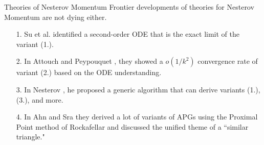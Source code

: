 \documentclass[11pt]{beamer}
\theoremstyle{definition}
\begin{document}
    \begin{frame}{Theories of Nesterov Momentum}
        Frontier developments of theories for Nesterov Momentum are not dying either. 
        \begin{itemize}
            \item [1.] Su et al. \cite{su_differential_2015} identified a second-order ODE that is the exact limit of the variant (1.). 
            \item [2.] In Attouch and Peypouquet \cite{attouch_rate_2016}, they showed a $o(1/k^2)$ convergence rate of variant (2.) based on the ODE understanding. 
            \item [3.] In Nesterov \cite{nesterov_lecture_2018}, he proposed a generic algorithm that can derive variants (1.), (3.), and more. 
            \item [4.] In Ahn and Sra \cite{ahn_understanding_2022}
            they derived a lot of variants of APGs using the Proximal Point method of Rockafellar and discussed the unified theme of a ``similar triangle." 
        \end{itemize}
    \end{frame}
\end{document}
